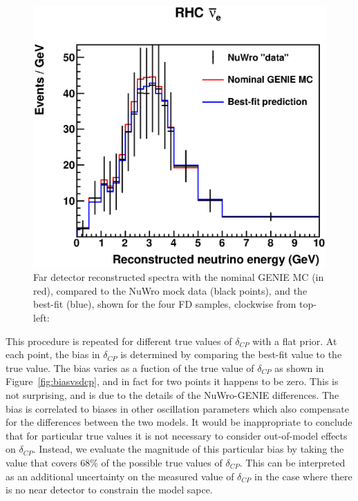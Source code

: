 \documentclass[11pt]{article}
\begin{document}
\begin{figure}[h]
\includegraphics[width=0.45\columnwidth]{graphics/bf_dcp0_NueRhc.eps}
\caption{Far detector reconstructed spectra with the nominal GENIE MC (in red), compared to the NuWro mock data (black points), and the best-fit (blue), shown for the four FD samples, clockwise from top-left: }
\label{fig:nuwro_fdfit}
\end{figure}

This procedure is repeated for different true values of $\delta_{CP}$ with a flat prior. At each point, the bias in $\delta_{CP}$ is determined by comparing the best-fit value to the true value. The bias varies as a fuction of the true value of $\delta_{CP}$ as shown in Figure~\ref{fig:biasvsdcp}, and in fact for two points it happens to be zero. This is not surprising, and is due to the details of the NuWro-GENIE differences. The bias is correlated to biases in other oscillation parameters which also compensate for the differences between the two models. It would be inappropriate to conclude that for particular true values it is not necessary to consider out-of-model effects on $\delta_{CP}$. Instead, we evaluate the magnitude of this particular bias by taking the value that covers 68\% of the possible true values of $\delta_{CP}$. This can be interpreted as an additional uncertainty on the measured value of $\delta_{CP}$ in the case where there is no near detector to constrain the model sapce.
\end{document}
